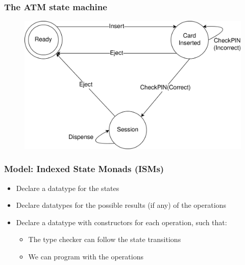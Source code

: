 \documentclass[compress,handout]{beamer}
\begin{document}
\begin{frame}
  \frametitle{The ATM state machine}

  \begin{figure}
    \centering
    \includegraphics[alt={A state diagram of an ATM, with circles for each state: Ready, CardInserted, and Session; labelled arrows between the states; with the labels containing the transition names: Insert, Dispense, CheckPIN(Correct), CheckPIN(Incorrect), and Eject.},width=0.8\framewidth]{ATM.png}
  \end{figure}
  \vspace*{-1cm}

\end{frame}


\begin{frame}
  \frametitle{Model: Indexed State Monads (ISMs)}

  \begin{itemize}
    \item<1-> Declare a datatype for the states
    \item<2-> Declare datatypes for the possible results (if any) of the
              operations
    \item<3-> Declare a datatype with constructors for each operation, such
              that:
      \begin{itemize}
        \item<4-> The type checker can follow the state transitions
        \item<5-> We can program with the operations
      \end{itemize}
  \end{itemize}

\end{frame}
\end{document}
